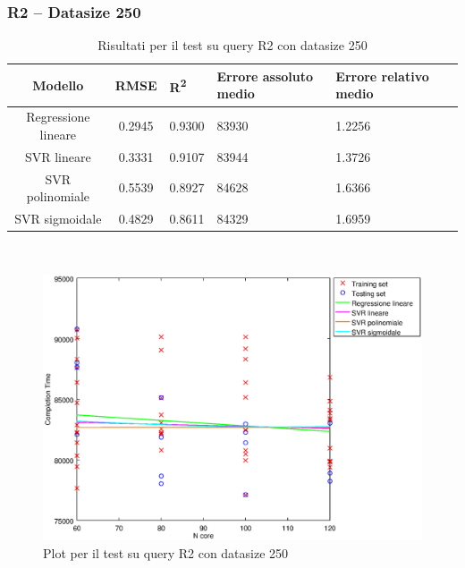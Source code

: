 \documentclass[a4paper,11pt]{article}
\begin{document}
\subsubsection{R2 -- Datasize 250}
\begin{table}[bhpt]
	\centering
	\begin{adjustbox}{center}
		\begin{tabular}{c | c M{1.2cm} M{2.5cm} M{2.5cm} M{1.8cm}}
			Modello & RMSE & R\textsuperscript{2} & Errore assoluto medio & Errore relativo medio \tabularnewline
			\hline
			Regressione lineare & 0.2945 & 0.9300 &  83930 & 1.2256 \\
			SVR lineare & 0.3331 & 0.9107 &  83944 & 1.3726 \\
			SVR polinomiale & 0.5539 & 0.8927 &  84628 & 1.6366 \\
			SVR sigmoidale & 0.4829 & 0.8611 &  84329 & 1.6959 \\
		\end{tabular}
	\end{adjustbox}
	\\
	\caption{Risultati per il test su query R2 con datasize 250}
	\label{table_R2_250}
\end{table}

\begin {figure}[hbtp]
\centering
\includegraphics[width=\textwidth]{output/R2_250/plot_R2_250.eps}
\caption {Plot per il test su query R2 con datasize 250}
\end {figure}

\newpage
\end{document}
